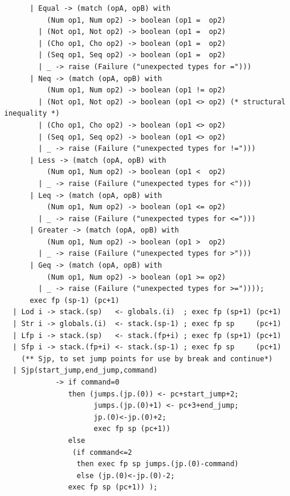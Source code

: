 \documentclass[12pt,A4]{book}
\begin{document}
\begin{verbatim}
      | Equal -> (match (opA, opB) with 
          (Num op1, Num op2) -> boolean (op1 =  op2)
		| (Not op1, Not op2) -> boolean (op1 =  op2)
		| (Cho op1, Cho op2) -> boolean (op1 =  op2)
		| (Seq op1, Seq op2) -> boolean (op1 =  op2)
        | _ -> raise (Failure ("unexpected types for =")))
      | Neq -> (match (opA, opB) with
          (Num op1, Num op2) -> boolean (op1 != op2)
		| (Not op1, Not op2) -> boolean (op1 <> op2) (* structural inequality *)
		| (Cho op1, Cho op2) -> boolean (op1 <> op2)
		| (Seq op1, Seq op2) -> boolean (op1 <> op2)
        | _ -> raise (Failure ("unexpected types for !=")))
      | Less -> (match (opA, opB) with 
          (Num op1, Num op2) -> boolean (op1 <  op2)
        | _ -> raise (Failure ("unexpected types for <")))
      | Leq -> (match (opA, opB) with 
          (Num op1, Num op2) -> boolean (op1 <= op2)
        | _ -> raise (Failure ("unexpected types for <=")))
      | Greater -> (match (opA, opB) with 
          (Num op1, Num op2) -> boolean (op1 >  op2)
        | _ -> raise (Failure ("unexpected types for >")))
      | Geq -> (match (opA, opB) with 
          (Num op1, Num op2) -> boolean (op1 >= op2)
        | _ -> raise (Failure ("unexpected types for >="))));
      exec fp (sp-1) (pc+1)
  | Lod i -> stack.(sp)   <- globals.(i)  ; exec fp (sp+1) (pc+1)
  | Str i -> globals.(i)  <- stack.(sp-1) ; exec fp sp     (pc+1)
  | Lfp i -> stack.(sp)   <- stack.(fp+i) ; exec fp (sp+1) (pc+1)
  | Sfp i -> stack.(fp+i) <- stack.(sp-1) ; exec fp sp     (pc+1)
    (** Sjp, to set jump points for use by break and continue*)
  | Sjp(start_jump,end_jump,command)
            -> if command=0 
               then (jumps.(jp.(0)) <- pc+start_jump+2; 
                     jumps.(jp.(0)+1) <- pc+3+end_jump;
                     jp.(0)<-jp.(0)+2;
                     exec fp sp (pc+1))
               else 
                (if command<=2  
                 then exec fp sp jumps.(jp.(0)-command)
                 else (jp.(0)<-jp.(0)-2; 
               exec fp sp (pc+1)) ); 


\end{verbatim}
\end{document}
